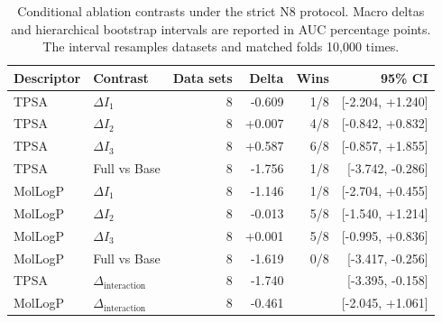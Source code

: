 \begin{table}[t]
\centering
\caption{Conditional ablation contrasts under the strict N8 protocol. Macro deltas and hierarchical bootstrap intervals are reported in AUC percentage points. The interval resamples datasets and matched folds 10,000 times.}
\label{tab:conditional-ablation}
\begin{tabular}{llrrrr}
\toprule
Descriptor & Contrast & Data sets & Delta & Wins & 95\% CI \\
\midrule
TPSA & $\Delta I_1$ & 8 & -0.609 & 1/8 & [-2.204, +1.240] \\
TPSA & $\Delta I_2$ & 8 & +0.007 & 4/8 & [-0.842, +0.832] \\
TPSA & $\Delta I_3$ & 8 & +0.587 & 6/8 & [-0.857, +1.855] \\
TPSA & Full vs Base & 8 & -1.756 & 1/8 & [-3.742, -0.286] \\
MolLogP & $\Delta I_1$ & 8 & -1.146 & 1/8 & [-2.704, +0.455] \\
MolLogP & $\Delta I_2$ & 8 & -0.013 & 5/8 & [-1.540, +1.214] \\
MolLogP & $\Delta I_3$ & 8 & +0.001 & 5/8 & [-0.995, +0.836] \\
MolLogP & Full vs Base & 8 & -1.619 & 0/8 & [-3.417, -0.256] \\
TPSA & $\Delta_{\mathrm{interaction}}$ & 8 & -1.740 &  & [-3.395, -0.158] \\
MolLogP & $\Delta_{\mathrm{interaction}}$ & 8 & -0.461 &  & [-2.045, +1.061] \\
\bottomrule
\end{tabular}
\end{table}
